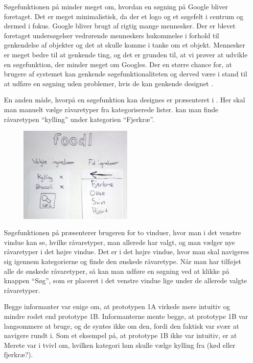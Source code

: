 Søgefunktionen på  minder meget om, hvordan en søgning på \fx Google bliver foretaget. Det er meget minimalistisk, da der et logo og et søgefelt i centrum og dermed i fokus. Google bliver brugt af rigtig mange mennesker\cite{alexaGoogle}. Der er blevet foretaget undersøgelser vedrørende menneskers hukommelse i forhold til genkendelse af objekter og det at skulle komme i tanke om et objekt. Mennesker er meget bedre til at genkende ting, og det er grunden til, at vi prøver at udvikle en søgefunktion, der minder meget om Googles. Der en større chance for, at brugere af systemet kan genkende søgefunktionaliteten og derved være i stand til at udføre en søgning uden problemer, hvis de kan genkende designet \cite[p. ~340]{deb}.

En anden måde, hvorpå en søgefunktion kan designes er præsenteret i . Her skal man manuelt vælge råvaretyper fra kategoriserede lister. \Fx kan man finde råvaretypen ``kylling'' under kategorien ``Fjerkræ''.

\begin{figure}[H]
	\centering
	\includegraphics[width=0.5\textwidth]{billeder/prototyper/prototype1b.jpg}
	\label{fig:prototype1bdesign}
\end{figure}

Søgefunktionen på  præsenterer brugeren for to vinduer, hvor man i det venstre vindue kan se, hvilke råvaretyper, man allerede har valgt, og man vælger nye råvaretyper i det højre vindue. Det er i det højre vindue, hvor man skal navigeres sig igennem kategorierne og finde den ønskede råvaretype. Når man har tilføjet alle de ønskede råvaretyper, så kan man udføre en søgning ved at klikke på knappen ``Søg'', som er placeret i det venstre vindue lige under de allerede valgte råvaretyper.

Begge informanter var enige om, at prototypen 1A virkede mere intuitiv og mindre rodet end prototype 1B. Informanterne mente begge, at prototype 1B var langsommere at bruge, og de syntes ikke om den, fordi den faktisk var svær at navigere rundt i. Som et eksempel på, at prototype 1B ikke var intuitiv, er at Merete var i tvivl om, hvilken kategori hun skulle vælge kylling fra (kød eller fjerkræ?). 

